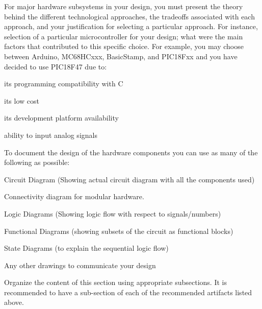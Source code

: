 \documentclass[../main.tex]{subfiles}
\begin{document}
\begin{newrequirements}
    \begin{todolist}
        \item For major hardware subsystems in your 
            design, you must present the theory 
            behind the different technological 
            approaches, the tradeoffs associated 
            with each approach, and your 
            justification for selecting a 
            particular approach. For instance, 
            selection of a particular 
            microcontroller for your design; what 
            were the main factors that contributed 
            to this specific choice. For example, 
            you may choose between Arduino, 
            MC68HCxxx, BasicStamp, and PIC18Fxx and 
            you have decided to use PIC18F47 due 
            to: 

        \begin{todolist}
        \item its programming compatibility with C 

        \item its low cost 

        \item its development platform availability 

        \item ability to input analog signals 
        \end{todolist}

        \item To document the design of the hardware 
        components you can use as many of the 
        following as possible: 

        \begin{todolist}
        \item Circuit Diagram (Showing actual circuit 
        diagram with all the components used) 

        \item Connectivity diagram for modular 
        hardware. 

        \item Logic Diagrams (Showing logic flow with 
        respect to signals/numbers) 

        \item Functional Diagrams (showing subsets of 
        the circuit as functional blocks) 

        \item State Diagrams (to explain the 
        sequential logic flow) 

        \item Any other drawings to communicate your 
        design 
        \end{todolist}

        \item Organize the content of this section 
        using appropriate subsections. It is 
        recommended to have a sub-section of 
        each of the recommended artifacts 
        listed above. 

    \end{todolist}
\end{newrequirements}
\end{document}
